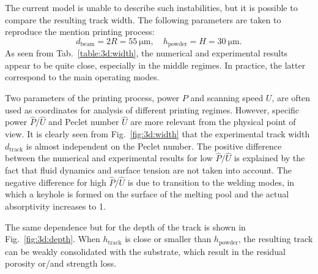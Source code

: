 \documentclass{article}
\newcommand{\HP}{\hat{P}}
\newcommand{\HU}{\hat{U}}
\begin{document}
The current model is unable to describe such instabilities,
but it is possible to compare the resulting track width.
The following parameters are taken to reproduce the mention printing process:
\begin{equation}\label{eq:single:trumpf}
    d_\mathrm{beam} = 2R = \SI{55}{\um}, \quad h_\mathrm{powder} = H=\SI{30}{\um}.
\end{equation}
As seen from Tab.~\ref{table:3d:width}, the numerical and experimental results appear to be quite close,
especially in the middle regimes. In practice, the latter correspond to the main operating modes.

Two parameters of the printing process, power \(P\) and scanning speed \(U\),
are often used as coordinates for analysis of different printing regimes.
However, specific power \(\HP/\HU\) and Peclet number \(\HU\) are more relevant
from the physical point of view.
It is clearly seen from Fig.~\ref{fig:3d:width} that the experimental track width \(d_\mathrm{track}\)
is almost independent on the Peclet number.
The positive difference between the numerical and experimental results for low \(\HP/\HU\) is
explained by the fact that fluid dynamics and surface tension are not taken into account.
The negative difference for high \(\HP/\HU\) is due to transition to the welding modes,
in which a keyhole is formed on the surface of the melting pool and the actual absorptivity increases to 1.

The same dependence but for the depth of the track is shown in Fig.~\ref{fig:3d:depth}.
When \(h_\mathrm{track}\) is close or smaller than \(h_\mathrm{powder}\),
the resulting track can be weakly consolidated with the substrate,
which result in the residual porosity or/and strength loss.


\printbibliography
\end{document}
